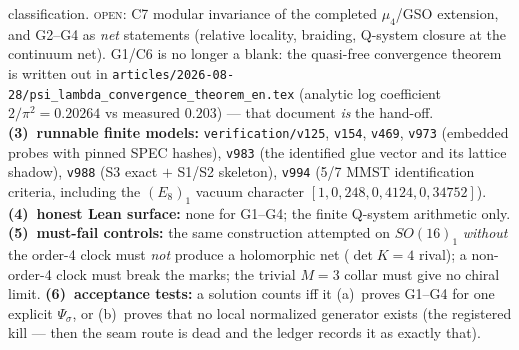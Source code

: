 classification.  \textsc{open}: C7 modular invariance of the completed $\mu_4$/GSO extension, and G2--G4 as
\emph{net} statements (relative locality, braiding, Q-system closure at the continuum net).
G1/C6 is no longer a blank: the quasi-free convergence theorem is written out in
\texttt{articles/2026-08-28/psi\_lambda\_convergence\_theorem\_en.tex} (analytic log coefficient
$2/\pi^2=0.20264$ vs measured $0.203$) --- that document \emph{is} the hand-off.
\textbf{(3)~runnable finite models:} \texttt{verification/v125}, \texttt{v154}, \texttt{v469},
\texttt{v973} (embedded probes with pinned SPEC hashes), \texttt{v983} (the identified glue
vector and its lattice shadow), \texttt{v988} (S3 exact $+$ S1/S2 skeleton),
\texttt{v994} (5/7 MMST identification criteria, including the $(E_8)_1$ vacuum character
$[1,0,248,0,4124,0,34752]$).
\textbf{(4)~honest Lean surface:} none for G1--G4; the finite Q-system arithmetic only.
\textbf{(5)~must-fail controls:} the same construction attempted on $SO(16)_1$ \emph{without}
the order-4 clock must \emph{not} produce a holomorphic net ($\det K = 4$ rival); a
non-order-4 clock must break the marks; the trivial $M{=}3$ collar must give no chiral limit.
\textbf{(6)~acceptance tests:} a solution counts iff it (a)~proves G1--G4 for one explicit
$\Psi_\sigma$, or (b)~proves that no local normalized generator exists (the registered kill ---
then the seam route is dead and the ledger records it as exactly that).

